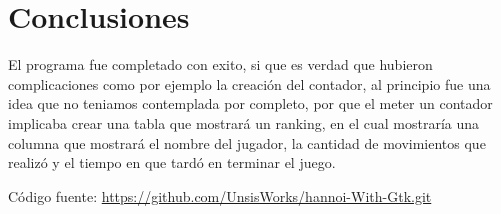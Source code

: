 \documentclass[letterpaper,12pt]{extarticle}%
\begin{document}
	    \section{Conclusiones}
		El programa fue completado con exito, si que es verdad que hubieron complicaciones como por ejemplo la creación del contador, al principio fue una idea que no teniamos contemplada por completo, por que el meter un contador implicaba crear una tabla que mostrará un ranking, en el cual mostraría una columna que mostrará el nombre del jugador, la cantidad de movimientos que realizó y el tiempo en que tardó en terminar el juego.
		
		Código fuente: \url{https://github.com/UnsisWorks/hannoi-With-Gtk.git}
    
	\newpage
	
	


	\cfoot{\LaTeX}
\end{document}
